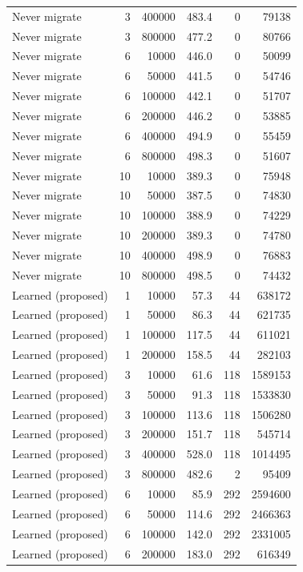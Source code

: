 \begin{table}[h]
\begin{tabular}{@{}lrrrrr@{}}
Never migrate & 3 & 400000 & 483.4 & 0 & 79138 \\
Never migrate & 3 & 800000 & 477.2 & 0 & 80766 \\
Never migrate & 6 & 10000 & 446.0 & 0 & 50099 \\
Never migrate & 6 & 50000 & 441.5 & 0 & 54746 \\
Never migrate & 6 & 100000 & 442.1 & 0 & 51707 \\
Never migrate & 6 & 200000 & 446.2 & 0 & 53885 \\
Never migrate & 6 & 400000 & 494.9 & 0 & 55459 \\
Never migrate & 6 & 800000 & 498.3 & 0 & 51607 \\
Never migrate & 10 & 10000 & 389.3 & 0 & 75948 \\
Never migrate & 10 & 50000 & 387.5 & 0 & 74830 \\
Never migrate & 10 & 100000 & 388.9 & 0 & 74229 \\
Never migrate & 10 & 200000 & 389.3 & 0 & 74780 \\
Never migrate & 10 & 400000 & 498.9 & 0 & 76883 \\
Never migrate & 10 & 800000 & 498.5 & 0 & 74432 \\
Learned (proposed) & 1 & 10000 & 57.3 & 44 & 638172 \\
Learned (proposed) & 1 & 50000 & 86.3 & 44 & 621735 \\
Learned (proposed) & 1 & 100000 & 117.5 & 44 & 611021 \\
Learned (proposed) & 1 & 200000 & 158.5 & 44 & 282103 \\
Learned (proposed) & 3 & 10000 & 61.6 & 118 & 1589153 \\
Learned (proposed) & 3 & 50000 & 91.3 & 118 & 1533830 \\
Learned (proposed) & 3 & 100000 & 113.6 & 118 & 1506280 \\
Learned (proposed) & 3 & 200000 & 151.7 & 118 & 545714 \\
Learned (proposed) & 3 & 400000 & 528.0 & 118 & 1014495 \\
Learned (proposed) & 3 & 800000 & 482.6 & 2 & 95409 \\
Learned (proposed) & 6 & 10000 & 85.9 & 292 & 2594600 \\
Learned (proposed) & 6 & 50000 & 114.6 & 292 & 2466363 \\
Learned (proposed) & 6 & 100000 & 142.0 & 292 & 2331005 \\
Learned (proposed) & 6 & 200000 & 183.0 & 292 & 616349 \\

\end{tabular}
\end{table}
